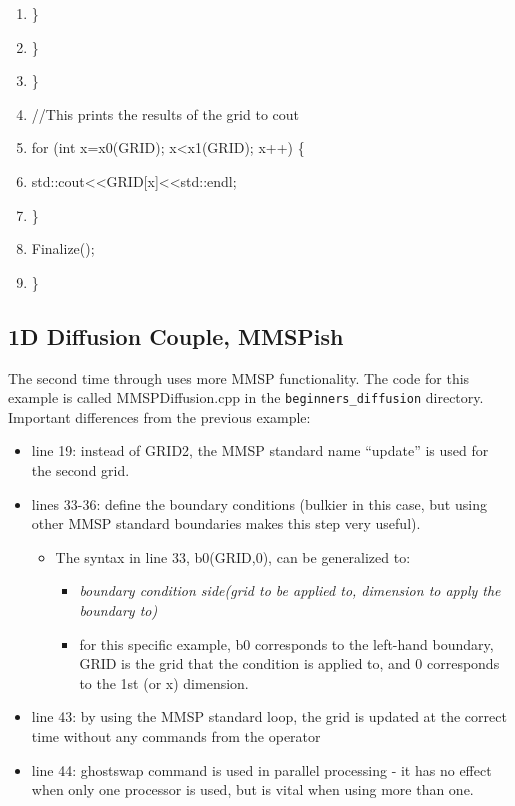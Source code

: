 \documentclass[10pt]{article}
\begin{document}
\begin{shadebox}
\begin{enumerate}
\item \hspace{10pt} \hspace{10pt}                 \}
\item \hspace{10pt}         \}
\item \}
\item //This prints the results of the grid to cout
\item for (int x=x0(GRID); x\textless x1(GRID); x++) \{
\item \hspace{10pt}         std::cout\textless \textless GRID[x]\textless \textless std::endl;
\item \}
\item Finalize();
\item \}
\end{enumerate}

\end{shadebox}

\subsection{1D Diffusion Couple, MMSPish}
The second time through uses more MMSP functionality. The code for this example is called MMSPDiffusion.cpp in the {\tt beginners\_diffusion} directory. Important differences from the previous example:
\begin{itemize} \itemsep1pt \parskip0pt 
\item line 19: instead of GRID2, the MMSP standard name “update” is used for the second grid.
\item lines 33-36: define the boundary conditions (bulkier in this case, but using other MMSP standard boundaries makes this step very useful).
\begin{itemize} \itemsep1pt \parskip0pt 
\item The syntax in line 33, b0(GRID,0), can be generalized to:
\begin{itemize} \itemsep1pt \parskip0pt 
\item \textit{boundary condition side(grid to be applied to, dimension to apply the boundary to)}
\item for this specific example, b0 corresponds to the left-hand boundary, GRID is the grid that the condition is applied to, and 0 corresponds to the 1st (or x) dimension.
\end {itemize}
\end {itemize}
\item line 43: by using the MMSP standard loop, the grid is updated at the correct time without any commands from the operator
\item line 44: ghostswap command is used in parallel processing - it has no effect when only one processor is used, but is vital when using more than one.
\end {itemize}
\end{document}
